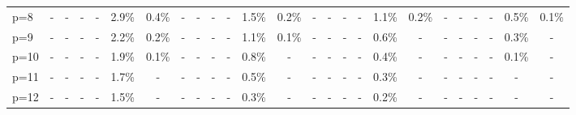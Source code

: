 \begin{table}[htbp]
\begin{tabular}{l|cccccccccccccccccccccccc}
p=8 & - & - & - & - & 2.9\% & 0.4\% & - & - & - & - & 1.5\% & 0.2\% & - & - & - & - & 1.1\% & 0.2\% & - & - & - & - & 0.5\% & 0.1\% \\
p=9 & - & - & - & - & 2.2\% & 0.2\% & - & - & - & - & 1.1\% & 0.1\% & - & - & - & - & 0.6\% & - & - & - & - & - & 0.3\% & - \\
p=10 & - & - & - & - & 1.9\% & 0.1\% & - & - & - & - & 0.8\% & - & - & - & - & - & 0.4\% & - & - & - & - & - & 0.1\% & - \\
p=11 & - & - & - & - & 1.7\% & - & - & - & - & - & 0.5\% & - & - & - & - & - & 0.3\% & - & - & - & - & - & - & - \\
p=12 & - & - & - & - & 1.5\% & - & - & - & - & - & 0.3\% & - & - & - & - & - & 0.2\% & - & - & - & - & - & - & - \\
\bottomrule
\end{tabular}
\end{table}
